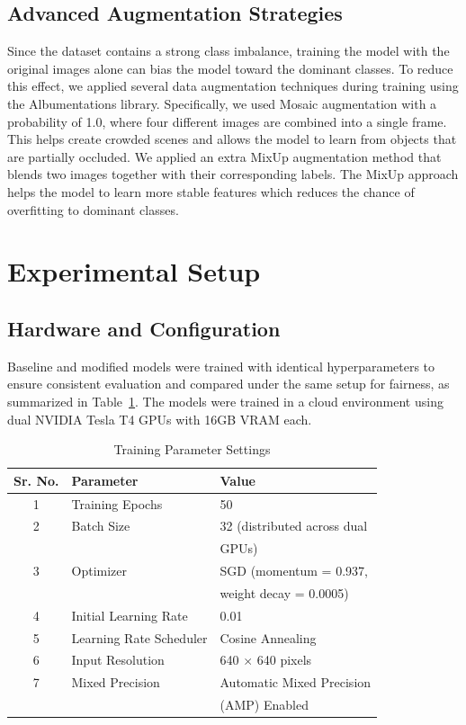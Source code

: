 \documentclass[sigconf]{acmart}
\begin{document}
\subsection{Advanced Augmentation Strategies}

Since the dataset contains a strong class imbalance, training the model with the original images alone can bias the model toward the dominant classes. To reduce this effect, we applied several data augmentation techniques during training using the Albumentations library. Specifically, we used Mosaic augmentation with a probability of 1.0, where four different images are combined into a single frame. This helps create crowded scenes and allows the model to learn from objects that are partially occluded. We applied an extra MixUp augmentation method that blends two images together with their corresponding labels. The MixUp approach helps the model to learn more stable features which reduces the chance of overfitting to dominant classes. 

\section{Experimental Setup}

\subsection{Hardware and Configuration}

Baseline and modified models were trained with identical hyperparameters to ensure consistent evaluation and compared under the same setup for fairness, as summarized in Table~\ref{tab:param}. The models were trained in a cloud environment using dual NVIDIA Tesla T4 GPUs with 16GB VRAM each. 
\begin{table}[h]
  \centering
  \caption{Training Parameter Settings}
  \label{tab:param}
  \begin{tabular}{cll}
    \toprule
    \textbf{Sr. No.} & \textbf{Parameter} & \textbf{Value} \\ 
    \midrule
    1 & Training Epochs & 50 \\ 
    2 & Batch Size & 32 (distributed across dual \\ 
      &            & GPUs) \\ 
    3 & Optimizer & SGD (momentum = 0.937, \\ 
      &           & weight decay = 0.0005) \\ 
    4 & Initial Learning Rate & 0.01 \\ 
    5 & Learning Rate Scheduler & Cosine Annealing \\ 
    6 & Input Resolution & 640 $\times$ 640 pixels \\ 
    7 & Mixed Precision & Automatic Mixed Precision \\ 
      &                 & (AMP) Enabled \\ 
    \bottomrule
  \end{tabular}
\end{table}
\end{document}
